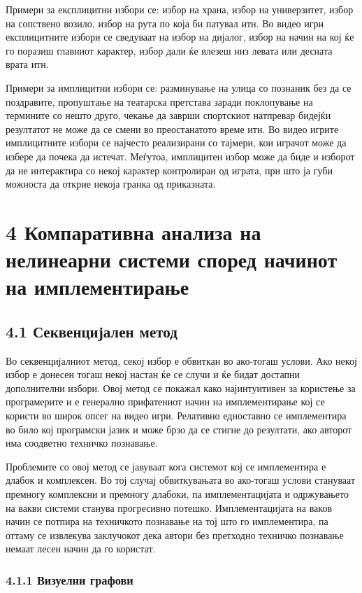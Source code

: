 Примери за експлицитни избори се: избор на храна, избор на универзитет, избор на сопствено возило, избор на рута по која би патувал итн. Во видео игри експлицитните избори се сведуваат на избор на дијалог, избор на начин на кој ќе го поразиш главниот карактер, избор дали ќе влезеш низ левата или десната врата итн.

Примери за имплицитни избори се: разминување на улица со познаник без да се поздравите, пропуштање на театарска претстава заради поклопување на термините со нешто друго, чекање да заврши спортскиот натпревар бидејќи резултатот не може да се смени во преостанатото време итн. Во видео игрите имплицитните избори се најчесто реализирани со тајмери, кои играчот може да избере да почека да истечат. Меѓутоа, имплицитен избор може да биде и изборот да не интерактира со некој карактер контролиран од играта, при што ја губи можноста да открие некоја гранка од приказната.

\section{4 Компаративна анализа на нелинеарни системи според начинот на имплементирање}


\subsection{4.1 Секвенцијален метод}

Во секвенцијалниот метод, секој избор е обвиткан во ако-тогаш услови. Ако некој избор е донесен тогаш некој настан ќе се случи и ќе бидат достапни дополнителни избори. Овој метод се покажал како најинтуитивен за користење за програмерите и е генерално прифатениот начин на имплементирање кој се користи во широк опсег на видео игри. Релативно едноставно се имплементира во било кој програмски јазик и може брзо да се стигне до резултати, ако авторот има соодветно техничко познавање.

Проблемите со овој метод се јавуваат кога системот кој се имплементира е длабок и комплексен. Во тој случај обвиткувањата во ако-тогаш услови стануваат премногу комплексни и премногу длабоки, па имплементацијата и одржувањето на вакви системи станува прогресивно потешко. Имплементацијата на ваков начин се потпира на техничкото познавање на тој што го имплементира, па оттаму се извлекува заклучокот дека автори без претходно техничко познавање немаат лесен начин да го користат.

\subsubsection{4.1.1 Визуелни графови}

